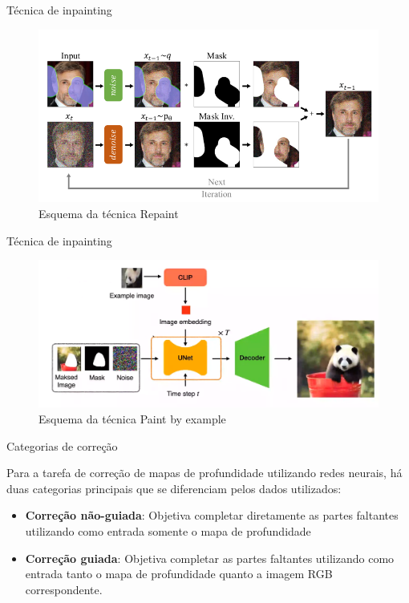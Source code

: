 \documentclass[aspectratio=169]{beamer}
\begin{document}
\begin{frame}{Técnica de inpainting}
    \begin{figure}
        \centering
        \includegraphics[width=.8\textwidth]{figs/repaint.png}
        \caption{Esquema da técnica Repaint}
    \end{figure}
\end{frame}

\begin{frame}{Técnica de inpainting}
    \begin{figure}
        \centering
        \includegraphics[width=\textwidth]{figs/paint_by_example.png}
        \caption{Esquema da técnica Paint by example}
    \end{figure}
\end{frame}


\begin{frame}{Categorias de correção}

Para a tarefa de correção de mapas de profundidade utilizando redes neurais, há duas categorias principais que se diferenciam pelos dados utilizados:

\begin{itemize}
    \item \textbf{Correção não-guiada}: Objetiva completar diretamente as partes faltantes utilizando como entrada somente o mapa de profundidade
    \item \textbf{Correção guiada}: Objetiva completar as partes faltantes utilizando como entrada tanto o mapa de profundidade quanto a imagem RGB correspondente.
\end{itemize}
\end{frame}
\end{document}
